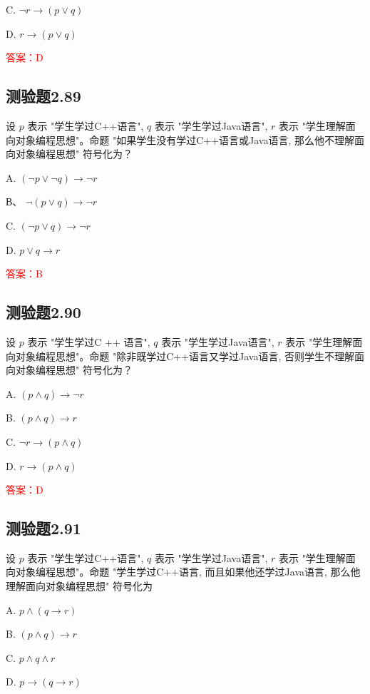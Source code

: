 \documentclass[UTF8, heading=true]{ctexart}
\begin{document}
C. $
\neg r \rightarrow(p \vee q)
$

D. $
r \rightarrow(p \vee q)
$

\textcolor{red}{答案：D}


\subsection{测验题2.89}

设 $p$ 表示 "学生学过C++语言", $q$ 表示 "学生学过Java语言", $r$ 表示
 "学生理解面向对象编程思想"。命题 "如果学生没有学过C++语言或Java语言, 
 那么他不理解面向对象编程思想" 符号化为？

A. $(\neg p \vee \neg q) \rightarrow \neg r$

В、 $\neg(p \vee q) \rightarrow \neg r$

C. $(\neg p \vee q) \rightarrow \neg r$

D. $ p \vee q \rightarrow r$

\textcolor{red}{答案：B}

\subsection{测验题2.90}

设 $p$ 表示 "学生学过C ++ 语言", $q$ 表示 "学生学过Java语言", $r$ 表示 
"学生理解面向对象编程思想"。命题 "除非既学过C++语言又学过Java语言, 
否则学生不理解面向对象编程思想" 符号化为？

A. $(p \wedge q) \rightarrow \neg r$

B. $(p \wedge q) \rightarrow r$

C. $ \neg r \rightarrow(p \wedge q)$

D. $ r \rightarrow(p \wedge q)$

\textcolor{red}{答案：D}

\subsection{测验题2.91}

设 $p$ 表示 "学生学过C++语言", $q$ 表示 "学生学过Java语言", $r$ 表示 
"学生理解面向对象编程思想"。命题 "学生学过C++语言, 而且如果他还学过Java语言, 
那么他理解面向对象编程思想" 符号化为 $\qquad$

A. $p \wedge(q \rightarrow r)$

B. $(p \wedge q) \rightarrow r$

C. $p \wedge q \wedge r$

D. $p \rightarrow(q \rightarrow r)$
\end{document}
